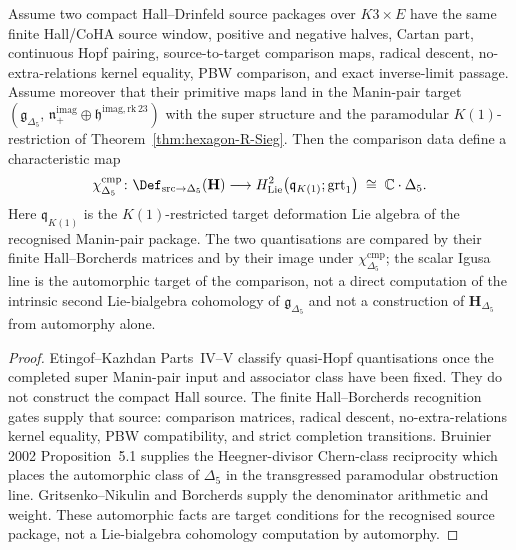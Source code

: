 \begin{theorem}
\label{thm:qca-etingof-kazhdan-super-classification}
Assume two compact Hall--Drinfeld source packages over $K3\times E$ have
the same finite Hall/CoHA source window, positive and negative halves,
Cartan part, continuous Hopf pairing, source-to-target comparison maps,
radical descent, no-extra-relations kernel equality, PBW comparison, and
exact inverse-limit passage. Assume moreover that their primitive maps
land in the Manin-pair target
$(\mathfrak{g}_{\Delta_5},\,\mathfrak{n}_+^{\mathrm{imag}}\oplus
\mathfrak{h}^{\mathrm{imag,rk\,23}})$ with the super structure and the
paramodular $K(1)$-restriction of Theorem~\ref{thm:hexagon-R-Sieg}.
Then the comparison data define a characteristic map
\[
 \chi^{\mathrm{cmp}}_{\Delta_5}\colon
 \Def_{\mathrm{src}\to\Delta_5}(\mathbf H)
 \longrightarrow
 H^2_{\mathrm{Lie}}\bigl(\mathfrak q_{K(1)};\mathrm{grt}_1\bigr)
 \;\cong\;
 \mathbb{C}\cdot\Delta_5.
\]
Here $\mathfrak q_{K(1)}$ is the $K(1)$-restricted target deformation
Lie algebra of the recognised Manin-pair package. The two quantisations
are compared by their finite Hall--Borcherds matrices and by their image
under $\chi^{\mathrm{cmp}}_{\Delta_5}$; the scalar Igusa line is the
automorphic target of the comparison, not a direct computation of
the intrinsic second Lie-bialgebra cohomology of
$\mathfrak{g}_{\Delta_5}$ and not a construction of $\mathbf H_{\Delta_5}$
from automorphy alone.
\end{theorem}

\begin{proof}
Etingof--Kazhdan Parts~IV--V classify quasi-Hopf quantisations once the
completed super Manin-pair input and associator class have been fixed.
They do not construct the compact Hall source. The finite Hall--Borcherds
recognition gates supply that source: comparison matrices, radical
descent, no-extra-relations kernel equality, PBW compatibility, and strict
completion transitions. Bruinier 2002 Proposition~5.1 supplies the
Heegner-divisor Chern-class reciprocity which places the automorphic
class of $\Delta_5$ in the transgressed paramodular obstruction line.
Gritsenko--Nikulin and Borcherds supply the denominator arithmetic and
weight. These automorphic facts are target conditions for the recognised
source package, not a Lie-bialgebra cohomology computation by
automorphy.
\end{proof}

